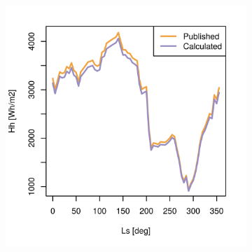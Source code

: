\begin{figure}[H]
\captionsetup[subfigure]{justification=centering}
\vspace{-2ex}
\centering
    \setlength{\subfigureWidth}{0.50\textwidth}
    \setlength{\graphicsHeight}{50mm}
    \hypersetup{hidelinks=true}%
    \begin{subfigure}[t]{\subfigureWidth}
        \centering
            \includegraphics[height=\graphicsHeight]{sections/appendix/insolation-calculation-verification/plots/hh-exp-calc-at-vl1.png}
            \label{fig:sub:comparative-global-insolation-at-vl1-horizontal-daily-variations}
    \end{subfigure}\hfill
    \begin{subfigure}[t]{\subfigureWidth}
        \centering

\end{subfigure}
\end{figure}
